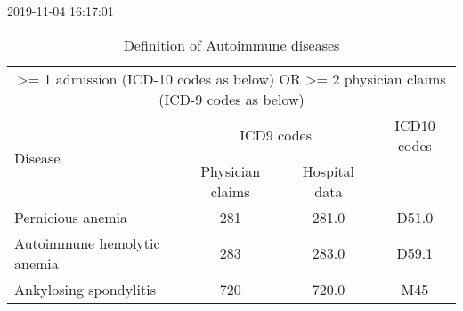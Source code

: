 \documentclass{article}
\begin{document}
2019-11-04 16:17:01

\begin{table}[htbp]
\centering
\setlength{\tabcolsep}{0.5em}
\def\arraystretch{1.5}  
\caption{Definition of Autoimmune diseases}
\begin{tabular}{l*{3}{c}}
\toprule
\multicolumn{4}{c}{>= 1 admission (ICD-10 codes as below) OR >= 2 physician claims (ICD-9 codes as below) }\\
\multirow{2}{*}{Disease                     }&\multicolumn{2}{c}{             ICD9 codes             }&     ICD10 codes     \\
                            & Physician claims &  Hospital data  &                     \\
\midrule
Pernicious anemia           &       281        &      281.0      &        D51.0        \\
Autoimmune hemolytic anemia &       283        &      283.0      &        D59.1        \\
Ankylosing spondylitis      &       720        &      720.0      &         M45         \\

\bottomrule
\end{tabular}
\label{table:mr}
\end{table}
\end{document}
